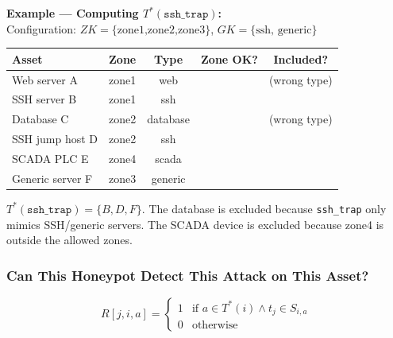 \documentclass[journal]{IEEEtran}
\newcommand{\cmark}{\ding{51}}
\newcommand{\xmark}{\ding{55}}
\begin{document}
\begin{examplebox}
\textbf{Example --- Computing $T^*(\texttt{ssh\_trap})$:}\\[3pt]
Configuration: $ZK=\{\text{zone1,zone2,zone3}\}$,
$GK=\{\text{ssh, generic}\}$
\begin{center}
\small
\renewcommand{\arraystretch}{1.1}
\begin{tabular}{@{}llccc@{}}
\toprule
\textbf{Asset} & \textbf{Zone} & \textbf{Type} &
\textbf{Zone OK?} & \textbf{Included?} \\
\midrule
Web server A    & zone1 & web    & \cmark & \xmark (wrong type) \\
SSH server B    & zone1 & ssh    & \cmark & \cmark \\
Database C      & zone2 & database& \cmark & \xmark (wrong type) \\
SSH jump host D & zone2 & ssh    & \cmark & \cmark \\
SCADA PLC E     & zone4 & scada  & \xmark & \xmark \\
Generic server F& zone3 & generic& \cmark & \cmark \\
\bottomrule
\end{tabular}
\end{center}
$T^*(\texttt{ssh\_trap}) = \{B, D, F\}$.
The database is excluded because \texttt{ssh\_trap} only
mimics SSH/generic servers.
The SCADA device is excluded because zone4 is outside
the allowed zones.
\end{examplebox}

\subsubsection{Can This Honeypot Detect This Attack
              on This Asset?}
\begin{equation}
  R[j,i,a] =
  \begin{cases}
    1 & \text{if } a \in T^*(i) \wedge t_j \in S_{i,a} \\
    0 & \text{otherwise}
  \end{cases}
\end{equation}
\end{document}
